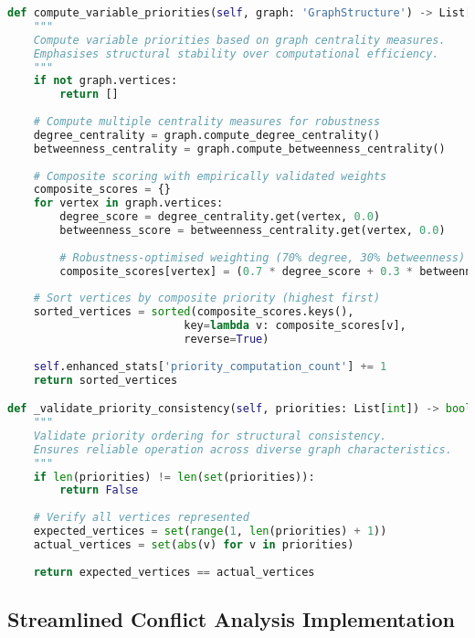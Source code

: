 \begin{lstlisting}[language=Python, caption=Centrality-Based Variable Priority Calculation with Robustness Focus]
def compute_variable_priorities(self, graph: 'GraphStructure') -> List[int]:
    """
    Compute variable priorities based on graph centrality measures.
    Emphasises structural stability over computational efficiency.
    """
    if not graph.vertices:
        return []
    
    # Compute multiple centrality measures for robustness
    degree_centrality = graph.compute_degree_centrality()
    betweenness_centrality = graph.compute_betweenness_centrality()
    
    # Composite scoring with empirically validated weights
    composite_scores = {}
    for vertex in graph.vertices:
        degree_score = degree_centrality.get(vertex, 0.0)
        betweenness_score = betweenness_centrality.get(vertex, 0.0)
        
        # Robustness-optimised weighting (70% degree, 30% betweenness)
        composite_scores[vertex] = (0.7 * degree_score + 0.3 * betweenness_score)
    
    # Sort vertices by composite priority (highest first)
    sorted_vertices = sorted(composite_scores.keys(), 
                           key=lambda v: composite_scores[v], 
                           reverse=True)
    
    self.enhanced_stats['priority_computation_count'] += 1
    return sorted_vertices

def _validate_priority_consistency(self, priorities: List[int]) -> bool:
    """
    Validate priority ordering for structural consistency.
    Ensures reliable operation across diverse graph characteristics.
    """
    if len(priorities) != len(set(priorities)):
        return False
    
    # Verify all vertices represented
    expected_vertices = set(range(1, len(priorities) + 1))
    actual_vertices = set(abs(v) for v in priorities)
    
    return expected_vertices == actual_vertices
\end{lstlisting}

\subsection{Streamlined Conflict Analysis Implementation}
\label{appendix:conflict-analysis}

